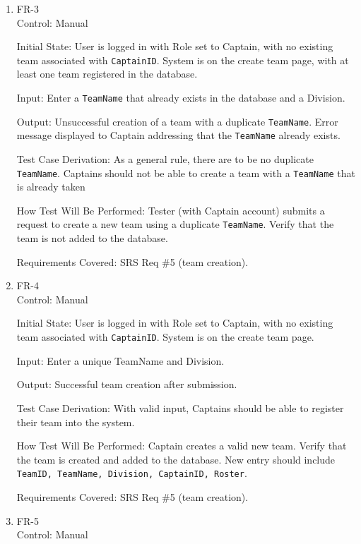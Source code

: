 \documentclass[12pt, titlepage]{article}
\begin{document}
\begin{enumerate}

  \item{FR-3\\}
        Control: Manual

        Initial State: User is logged in with Role set to Captain, with no existing team associated with \texttt{CaptainID}. System is on the create team page, with at least one team registered in the database.

        Input: Enter a \texttt{TeamName} that already exists in the database and a Division.

        Output: Unsuccessful creation of a team with a duplicate \texttt{TeamName}. Error message displayed to Captain addressing that the \texttt{TeamName} already exists.

        Test Case Derivation: As a general rule, there are to be no duplicate \texttt{TeamName}. Captains should not be able to create a team with a \texttt{TeamName} that is already taken

        How Test Will Be Performed: Tester (with Captain account) submits a request to create a new team using a duplicate \texttt{TeamName}. Verify that the team is not added to the database.

        Requirements Covered: SRS Req \#5 (team creation).

  \item{FR-4\\}
        Control: Manual

        Initial State: User is logged in with Role set to Captain, with no existing team associated with \texttt{CaptainID}. System is on the create team page.

        Input: Enter a unique TeamName and Division.

        Output: Successful team creation after submission.

        Test Case Derivation: With valid input, Captains should be able to register their team into the system.

        How Test Will Be Performed: Captain creates a valid new team. Verify that the team is created and added to the database. New entry should include \texttt{TeamID, TeamName, Division, CaptainID, Roster}.

        Requirements Covered: SRS Req \#5 (team creation).

  \item{FR-5\\}
        Control: Manual


\end{enumerate}
\end{document}
